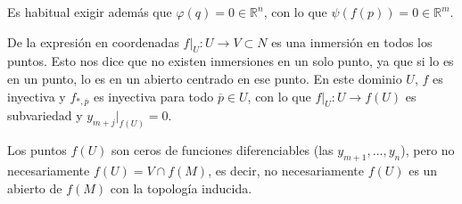 \begin{obs}
Es habitual exigir además que $\varphi(q) = 0\in \mathbb{R}^n$, con lo que $\psi(f(p)) = 0 \in \mathbb{R}^m$.

De la expresi\'on en coordenadas $f|_U:U \longrightarrow V \subset N$ es una inmersi\'on en todos los puntos. Esto nos dice que no existen inmersiones en un solo punto, ya que si lo es en un punto, lo es en un abierto centrado en ese punto. En  este dominio $U$, $f$ es inyectiva y $f_{*,\overline{p}}$ es inyectiva para todo $\overline{p} \in U$, con lo que $f|_U:U\to f(U)$ es subvariedad y $y_{m+j}|_{f(U)} = 0$.

Los puntos $f(U)$ son ceros de funciones diferenciables (las $y_{m+1}, \ldots, y_n$), pero no necesariamente $f(U)=V \cap f(M)$, es decir, no necesariamente $f(U)$ es un abierto de $f(M)$ con la topolog\'ia inducida. 
\end{obs}

